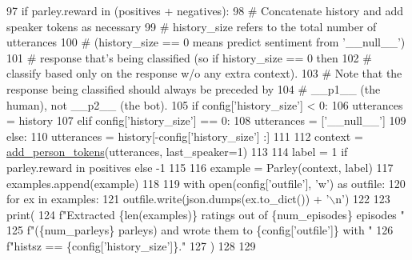 \begin{DoxyCode}
97             \textcolor{keywordflow}{if} parley.reward \textcolor{keywordflow}{in} (positives + negatives):
98                 \textcolor{comment}{# Concatenate history and add speaker tokens as necessary}
99                 \textcolor{comment}{# history\_size refers to the total number of utterances}
100                 \textcolor{comment}{# (history\_size == 0 means predict sentiment from '\_\_null\_\_')}
101                 \textcolor{comment}{# response that's being classified (so if history\_size == 0 then}
102                 \textcolor{comment}{# classify based only on the response w/o any extra context).}
103                 \textcolor{comment}{# Note that the response being classified should always be preceded by}
104                 \textcolor{comment}{# \_\_p1\_\_ (the human), not \_\_p2\_\_ (the bot).}
105                 \textcolor{keywordflow}{if} config[\textcolor{stringliteral}{'history\_size'}] < 0:
106                     utterances = history
107                 \textcolor{keywordflow}{elif} config[\textcolor{stringliteral}{'history\_size'}] == 0:
108                     utterances = [\textcolor{stringliteral}{'\_\_null\_\_'}]
109                 \textcolor{keywordflow}{else}:
110                     utterances = history[-config[\textcolor{stringliteral}{'history\_size'}] :]
111 
112                 context = \hyperlink{namespaceprojects_1_1self__feeding_1_1utils_a3f3d055dc6c4058057baae7b240de5ec}{add\_person\_tokens}(utterances, last\_speaker=1)
113 
114                 label = 1 \textcolor{keywordflow}{if} parley.reward \textcolor{keywordflow}{in} positives \textcolor{keywordflow}{else} -1
115 
116                 example = Parley(context, label)
117                 examples.append(example)
118 
119     with open(config[\textcolor{stringliteral}{'outfile'}], \textcolor{stringliteral}{'w'}) \textcolor{keyword}{as} outfile:
120         \textcolor{keywordflow}{for} ex \textcolor{keywordflow}{in} examples:
121             outfile.write(json.dumps(ex.to\_dict()) + \textcolor{stringliteral}{'\(\backslash\)n'})
122 
123     print(
124         f\textcolor{stringliteral}{"Extracted \{len(examples)\} ratings out of \{num\_episodes\} episodes "}
125         f\textcolor{stringliteral}{"(\{num\_parleys\} parleys) and wrote them to \{config['outfile']\} with "}
126         f\textcolor{stringliteral}{"histsz == \{config['history\_size']\}."}
127     )
128 
129 
\end{DoxyCode}
\mbox{\label{namespaceprojects_1_1self__feeding_1_1scripts_1_1convert__rated__to__polarized_acba2c1088cdc95f703203c9166b9499d}} 
